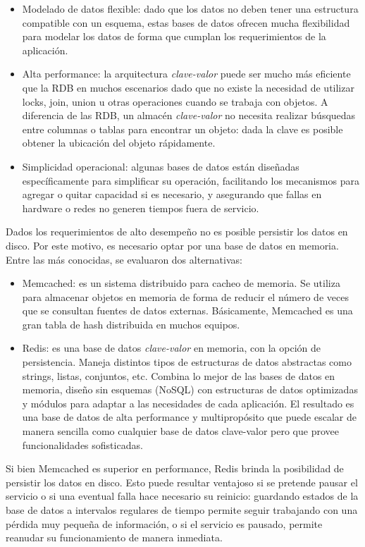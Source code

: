\documentclass[a4paper,12pt, oneside]{article}
\begin{document}
\begin{itemize}
	\item Modelado de datos flexible: dado que los datos no deben tener una estructura compatible con un esquema, estas bases de datos ofrecen mucha flexibilidad para modelar los datos de forma que cumplan los requerimientos de la aplicación.
	\item Alta performance: la arquitectura \textit{clave-valor} puede ser mucho más eficiente que la RDB en muchos escenarios dado que no existe la necesidad de utilizar locks, join, union u otras operaciones cuando se trabaja con objetos. A diferencia de las RDB, un almacén \textit{clave-valor} no necesita realizar búsquedas entre columnas o tablas para encontrar un objeto: dada la clave es posible obtener la ubicación del objeto rápidamente.
	\item Simplicidad operacional: algunas bases de datos están diseñadas específicamente para simplificar su operación, facilitando los mecanismos para agregar o quitar capacidad si es necesario, y asegurando que fallas en hardware o redes no generen tiempos fuera de servicio.
\end{itemize}

Dados los requerimientos de alto desempeño no es posible persistir los datos en disco. Por este motivo, es necesario optar por una base de datos en memoria. Entre las más conocidas, se evaluaron dos alternativas:

\begin{itemize}
	\item Memcached: es un sistema distribuido para cacheo de memoria. Se utiliza para almacenar objetos en memoria de forma de reducir el número de veces que se consultan fuentes de datos externas. Básicamente, Memcached es una gran tabla de hash distribuida en muchos equipos.
	\item Redis: es una base de datos \textit{clave-valor} en memoria, con la opción de persistencia. Maneja distintos tipos de estructuras de datos abstractas como strings, listas, conjuntos, etc. Combina lo mejor de las bases de datos en memoria, diseño sin esquemas (NoSQL) con estructuras de datos optimizadas y módulos para adaptar a las necesidades de cada aplicación. El resultado es una base de datos de alta performance y multipropósito que puede escalar de manera sencilla como cualquier base de datos clave-valor pero que provee funcionalidades sofisticadas.
\end{itemize}

Si bien Memcached es superior en performance, Redis brinda la posibilidad de persistir los datos en disco. Esto puede resultar ventajoso si se pretende pausar el servicio o si una eventual falla hace necesario su reinicio: guardando estados de la base de datos a intervalos regulares de tiempo permite seguir trabajando con una pérdida muy pequeña de información, o si el servicio es pausado, permite reanudar su funcionamiento de manera inmediata.
\end{document}
